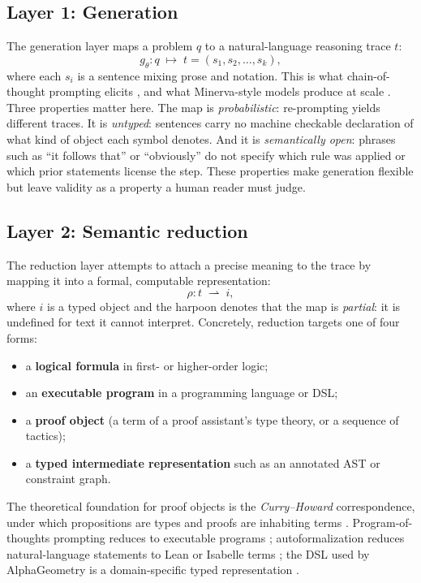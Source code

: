 \documentclass[11pt,a4paper]{article}
\newcommand{\reducemap}{\rho}
\newcommand{\policy}{g_\theta}
\theoremstyle{plain}
\theoremstyle{definition}
\theoremstyle{remark}
\begin{document}
\subsection{Layer 1: Generation}
The generation layer maps a problem $q$ to a natural-language reasoning
trace $t$:
\begin{equation}
\policy : q \;\longmapsto\; t = (s_1,s_2,\dots,s_k),
\end{equation}
where each $s_i$ is a sentence mixing prose and notation. This is what
chain-of-thought prompting elicits \citep{wei2022cot}, and what
Minerva-style models produce at scale \citep{lewkowycz2022minerva}. Three
properties matter here. The map is \emph{probabilistic}: re-prompting
yields different traces. It is \emph{untyped}: sentences carry no machine
checkable declaration of what kind of object each symbol denotes. And it is
\emph{semantically open}: phrases such as ``it follows that'' or
``obviously'' do not specify which rule was applied or which prior
statements license the step. These properties make generation flexible but
leave validity as a property a human reader must judge.

\subsection{Layer 2: Semantic reduction}
The reduction layer attempts to attach a precise meaning to the trace by
mapping it into a formal, computable representation:
\begin{equation}
\reducemap : t \;\rightharpoonup\; i,
\end{equation}
where $i$ is a typed object and the harpoon denotes that the map is
\emph{partial}: it is undefined for text it cannot interpret. Concretely,
reduction targets one of four forms:
\begin{itemize}[leftmargin=2em,itemsep=2pt,topsep=3pt]
\item a \textbf{logical formula} in first- or higher-order logic;
\item an \textbf{executable program} in a programming language or DSL;
\item a \textbf{proof object} (a term of a proof assistant's type theory,
or a sequence of tactics);
\item a \textbf{typed intermediate representation} such as an annotated
AST or constraint graph.
\end{itemize}
The theoretical foundation for proof objects is the \emph{Curry--Howard}
correspondence, under which propositions are types and proofs are
inhabiting terms \citep{sorensen2006curryhoward}. Program-of-thoughts
prompting reduces to executable programs \citep{chen2023pot};
autoformalization reduces natural-language statements to Lean or Isabelle
terms \citep{polu2022curriculum,xin2024deepseekprover}; the DSL used by
AlphaGeometry is a domain-specific typed representation
\citep{trinh2024alphageometry}.
\end{document}
